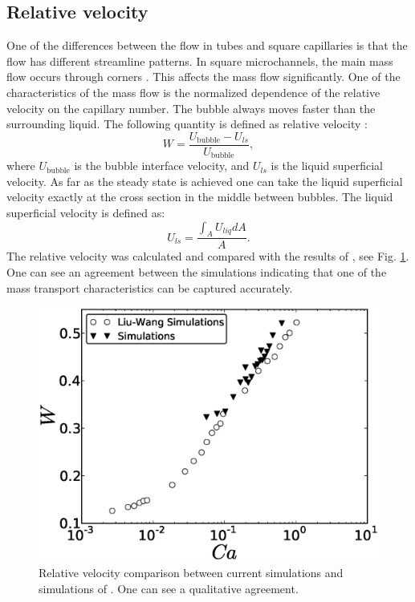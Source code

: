 \documentclass[preprint,12pt]{elsarticle}
\begin{document}
\subsection{Relative velocity}
One of the differences between the flow in tubes and square capillaries is that the flow has
different streamline patterns. In square microchannels, the main mass flow occurs through corners
\cite{heil-threedim,wang-non-circular}. This affects the mass flow significantly. One of the
characteristics of the mass flow is the normalized dependence of the relative velocity on the
capillary
number. The bubble always moves faster than the surrounding liquid. The following quantity is
defined as
relative velocity \cite{cerro-bubble-train}:
\begin{equation}
W=\frac{U_{\mathrm{bubble}}-U_{ls}}{U_{\mathrm{bubble}}},
\end{equation}
where $U_{\mathrm{bubble}}$ is the bubble interface velocity, and $U_{ls}$ is the liquid superficial
velocity. As far as the steady state is achieved one can take the liquid superficial velocity
exactly at the cross section in the middle between bubbles. The liquid superficial velocity is
defined as:
\begin{equation}
U_{ls}=\frac{\int_{A}{U_{liq}dA}}{A}.
\end{equation}
The relative velocity was calculated and compared with the results of \citet{wang-non-circular},
see Fig. \ref{fig:relative:velocity}. One can see an agreement between the simulations indicating
that
one of the mass transport characteristics can be captured accurately. 
\begin{figure}[ht]
\includegraphics[width=\textwidth]{Figures/relative_velocity.eps}
\caption{Relative velocity comparison between current simulations and simulations of
\citet{wang-non-circular}. One can see a qualitative agreement. \label{fig:relative:velocity}}
\end{figure}
\end{document}
